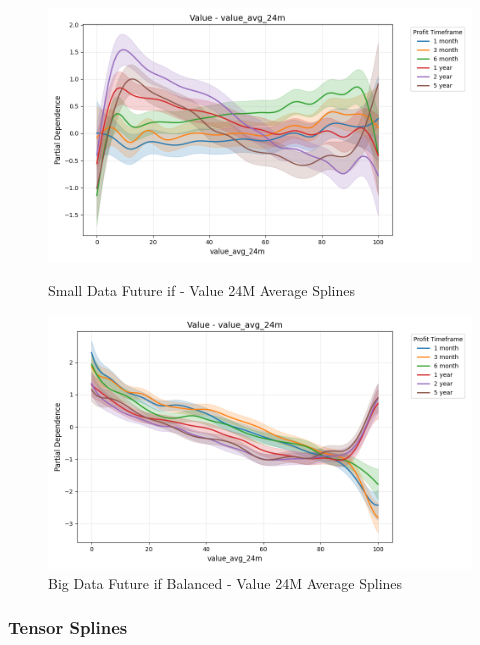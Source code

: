\documentclass[11pt,english,a4paper,hidelinks]{book}
\begin{document}
\begin{figure}[H]
    \centering
    \begin{minipage}{0.48\textwidth}
        \centering
        \includegraphics[width=\textwidth]{images/code/models/general_regression/splines/2D/Small Data future - IF/value_value_avg_24m.png}
        \caption{Small Data Future \acrshort{if} -  Value 24M Average Splines}
        \label{fig:spline_value_value_avg_24m}
    \end{minipage}\hfill
    \begin{minipage}{0.48\textwidth}
        \centering
        \includegraphics[width=\textwidth]{images/code/models/general_regression/splines/2D/Big Data future - IF HARD Balanced/value_value_avg_24m.png}
        \caption{Big Data Future \acrshort{if} Balanced -  Value 24M Average Splines}
        \label{fig:spline_value_value_avg_24m_balanced}
    \end{minipage}
\end{figure}

\subsubsection{Tensor Splines}
\end{document}
